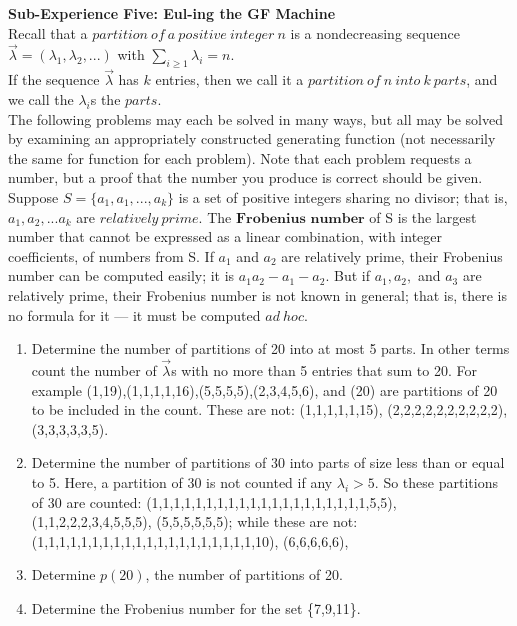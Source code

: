 \documentclass[10pt,a4paper]{report}
\begin{document}
	\textbf{Sub-Experience Five: Eul-ing the GF Machine}\\
	Recall that a $partition\ of\ a\ positive\ integer\ n$ is a nondecreasing sequence $\vec{\lambda} = (\lambda_1,\lambda_2,...)$ with $\sum_{i\geq1}^{}\lambda_i = n$.\\
	If the sequence $\vec{\lambda}$ has $k$ entries, then we call it a $partition\ of\ n\ into\ k\ parts$, and we call the $\lambda_i$s the $parts$.\\
	The following problems may each be solved in many ways, but all may be solved by examining an appropriately constructed generating function (not necessarily the same for function for each problem).  Note that each problem requests a number, but a proof that the number you produce is correct should be given.\\
	Suppose $S = \{a_1,a_1,...,a_k\}$ is a set of positive integers sharing no divisor; that is, $a_1,a_2,...a_k$ are $relatively\ prime$.  The $\textbf{Frobenius number}$ of S is the largest number that cannot be expressed as a linear combination, with integer coefficients, of numbers from S.  If $a_1$ and $a_2$ are relatively prime, their Frobenius number can be computed easily; it is $a_1a_2 - a_1 - a_2$.  But if $a_1,a_2,$ and $a_3$ are relatively prime, their Frobenius number is not known in general; that is, there is no formula for it --- it must be computed $ad\ hoc$.\\
	\begin{enumerate}
		\item Determine the number of partitions of 20 into at most 5 parts.  In other terms count the number of $\vec{\lambda}$s with no more than 5 entries that sum to 20.  For example (1,19),(1,1,1,1,16),(5,5,5,5),(2,3,4,5,6), and (20) are partitions of 20 to be included in the count.  These are not: (1,1,1,1,1,15), (2,2,2,2,2,2,2,2,2,2), (3,3,3,3,3,5).
		\item Determine the number of partitions of 30 into parts of size less than or equal to 5.  Here, a partition of 30 is not counted if any $\lambda_i > 5$.  So these partitions of 30 are counted: (1,1,1,1,1,1,1,1,1,1,1,1,1,1,1,1,1,1,1,1,5,5), (1,1,2,2,2,3,4,5,5,5), (5,5,5,5,5,5); while these are not: (1,1,1,1,1,1,1,1,1,1,1,1,1,1,1,1,1,1,1,1,10), (6,6,6,6,6),
		\item Determine $p(20)$, the number of partitions of 20.
		\item Determine the Frobenius number for the set \{7,9,11\}.\\
	\end{enumerate}
\end{document}
